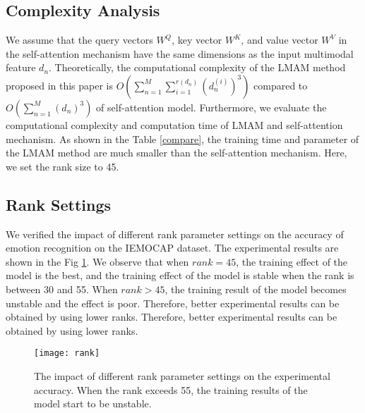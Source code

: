 {{\subsection{Complexity Analysis}
We assume that the query vectors $W^Q$, key vector  $W^K$, and value vector  $W^V$ in the self-attention mechanism have the same dimensions as the input multimodal feature $d_n$. Theoretically, the computational complexity of the LMAM method proposed in this paper is $O\left(\sum_{n=1}^M \sum_{i=1}^{r(d_n)} ({d_n^{(i)}})^3\right)$ compared to $O\left(\sum_{n=1}^M (d_n)^3\right)$ of self-attention model. {Furthermore}, we evaluate the computational complexity and computation time of LMAM and self-attention mechanism. As shown in the Table \ref{compare}, the training time and parameter of the LMAM method are much smaller than the self-attention mechanism. Here, we set the rank size to 45.

\subsection{Rank Settings}
We verified the impact of different rank parameter settings on the accuracy of emotion recognition on the IEMOCAP dataset. The experimental results are shown in the Fig \ref{fig:rank}. We observe that when $rank=45$, the training effect of the model is the best, and the training effect of the model is stable when the rank is between 30 and 55. When $rank > 45$, the training result of the model becomes unstable and the effect is poor. Therefore, better experimental results can be obtained by using lower ranks. Therefore, better experimental results can be obtained by using lower ranks.

\begin{table}
	\centering
	\caption{Comparison the training speed and parameters of self-attention mechanism and LMAM method in an epoch. Emocaps is selected as our architecture.}
	\label{compare}
	\renewcommand\arraystretch{1.2}
\end{table}

\begin{figure}
	\centering
	\texttt{[image: rank]}
	\caption{The impact of different rank parameter settings on the experimental accuracy. When the rank exceeds 55, the training results of the model start to be unstable.}
	\label{fig:rank}
\end{figure}

}}
